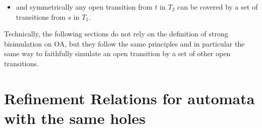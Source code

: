\documentclass[runningheads]{llncs}
\begin{document}
\begin{definition}
\begin{itemize}
     
 \item  and symmetrically any open transition from $t$ in ${T}_2$ can be 
      covered by a set of transitions from $s$ in ${T}_1$.
 \end{itemize}

 

 \end{definition}
Technically, the following sections do not rely on the definition of strong bisimulation on OA, but they follow the same principles and in particular the same way to faithfully simulate an open transition by a set of other open transitions.

\section{Refinement Relations for automata with the same holes}\label{sec:refinement}
\end{document}
